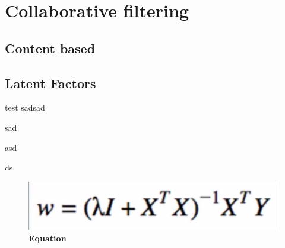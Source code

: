 \section{Collaborative filtering}
\subsection{Content based}
\subsection{Latent Factors}
test
sadsad

sad

asd

ds
\begin{figure}[ht]
\centering
\includegraphics[width=0.7\linewidth]{images/equation01}
\caption{\bfseries Equation}
\label{fig:equation02}
\end{figure}